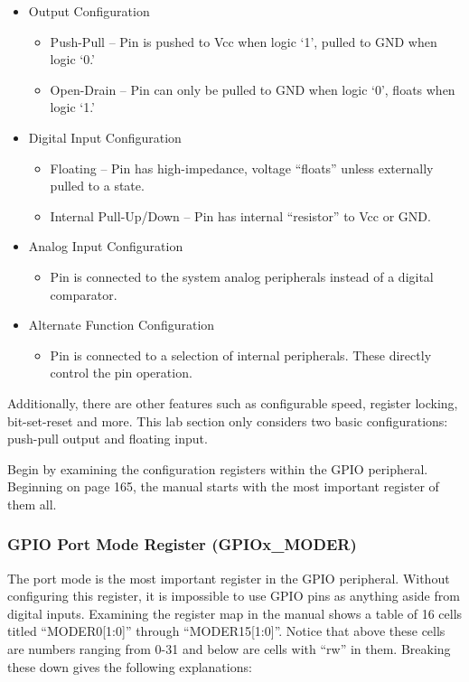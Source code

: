 \documentclass[11pt,fleqn]{book} %
\begin{document}
\begin{itemize}
    \item Output Configuration
    \begin{itemize}
        \item Push-Pull -- Pin is pushed to Vcc when logic `1', pulled to GND when logic `0.'
        \item Open-Drain -- Pin can only be pulled to GND when logic `0', floats when logic `1.'
    \end{itemize}
    \item Digital Input Configuration
    \begin{itemize}
        \item Floating -- Pin has high-impedance, voltage ``floats'' unless externally pulled to a state.
        \item Internal Pull-Up/Down -- Pin has internal ``resistor'' to Vcc or GND.
    \end{itemize}
    \item Analog Input Configuration
    \begin{itemize}
        \item Pin is connected to the system analog peripherals instead of a digital comparator.
    \end{itemize}
    \item Alternate Function Configuration
    \begin{itemize}
        \item Pin is connected to a selection of internal peripherals. These directly control the pin operation.
    \end{itemize}
\end{itemize} 

Additionally, there are other features such as configurable speed, register locking, bit-set-reset and more. This lab section only considers two basic configurations: push-pull output and floating input.

Begin by examining the configuration registers within the GPIO peripheral. Beginning on page 165, the manual starts with the most important register of them all. 

\subsubsection{GPIO Port Mode Register (GPIOx\_MODER)}

The port mode is the most important register in the GPIO peripheral. Without configuring this register, it is impossible to use GPIO pins as anything aside from digital inputs. Examining the register map in the manual shows a table of 16 cells titled ``MODER0[1:0]'' through ``MODER15[1:0]''. Notice that above these cells are numbers ranging from 0-31 and below are cells with ``rw'' in them. Breaking these down gives the following explanations: 
\end{document}
